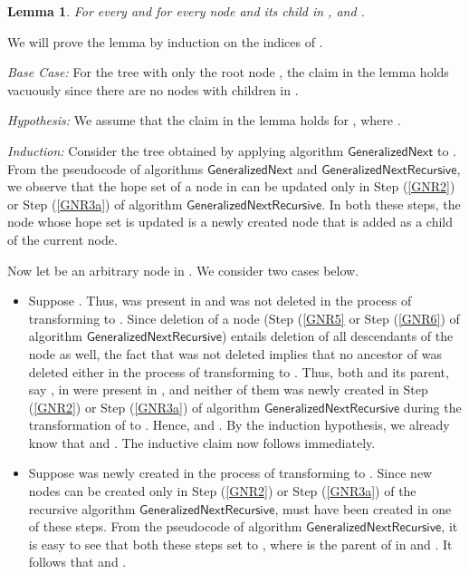 \documentclass[3p]{elsarticle}
\newtheorem{lemma}[theorem]{Lemma}
\newcommand{\algo}[1]{\ensuremath{\textsf{{#1}}}}
\begin{document}
\begin{lemma}
\label{lemmaD}
For every  and for every node  and its child  in
,  and .
\end{lemma}
 We will prove the lemma by induction on the
indices of .

\noindent \emph{Base Case:} For the tree  with only the root node
, the claim in the lemma holds vacuously since there are no nodes
with children in .

\noindent \emph{Hypothesis:} We assume that the claim in the lemma
holds for , where .

\noindent \emph{Induction:} Consider the tree  obtained by
applying algorithm \algo{GeneralizedNext} to .  From the
pseudocode of algorithms \algo{GeneralizedNext} and
\algo{GeneralizedNextRecursive}, we observe that the hope set of a
node in  can be updated only in Step (\ref{GNR2}) or Step
(\ref{GNR3a}) of algorithm \algo{GeneralizedNextRecursive}.  In both
these steps, the node whose hope set is updated is a newly created
node that is added as a child of the current node.

Now let  be an arbitrary node in .  We consider two
cases below.
\begin{itemize}
\item Suppose .  Thus,  was present in
   and was not deleted in the process of transforming  to
  .  Since deletion of a node (Step (\ref{GNR5} or Step
  (\ref{GNR6}) of algorithm \algo{GeneralizedNextRecursive}) entails
  deletion of all descendants of the node as well, the fact that 
  was not deleted implies that no ancestor of  was deleted either
  in the process of transforming  to .  Thus, both 
  and its parent, say , in  were present in , and
  neither of them was newly created in Step
  (\ref{GNR2}) or Step (\ref{GNR3a}) of algorithm
  \algo{GeneralizedNextRecursive} during the transformation of 
  to .  Hence,  and .  By the induction hypothesis, we already know that
   and .
  The inductive claim now follows immediately.
  
\item Suppose  was newly created in the process of transforming
   to .  Since new nodes can be created only in Step
  (\ref{GNR2}) or Step (\ref{GNR3a}) of the recursive algorithm
  \algo{GeneralizedNextRecursive},  must have been created in one
  of these steps.  From the pseudocode of algorithm
  \algo{GeneralizedNextRecursive}, it is easy to see that both these
  steps set  to , where  is
  the parent of  in  and .  It
    follows that  and .
\end{itemize}
\end{document}
